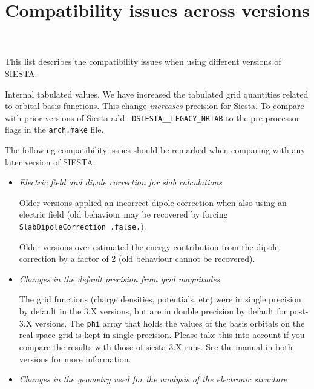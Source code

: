 \documentclass{article}
\title{Compatibility issues across versions}
\author{\siesta}
\newcommand\siesta{\textsc{SIESTA}}
\newcommand{\code}[1]{\texttt{#1}}
\begin{document}
\maketitle

\clearpage

This list describes the compatibility issues when using different versions of \siesta.

\begin{description}
  \setlength\itemsep{1pt}
  \setlength\topsep{1pt}

  \item[\emph{any} --- 4.0.2] %
  Internal tabulated values. We have increased the tabulated grid quantities related to
  orbital basis functions. This change \emph{increases} precision for Siesta. To compare
  with prior versions of Siesta add \texttt{-DSIESTA\_\_LEGACY\_NRTAB} to the pre-processor
  flags in the \texttt{arch.make} file.

  \item[\emph{any} --- 4.0-b2] The following compatibility issues should be remarked when
  comparing with any later version of \siesta.

  \begin{itemize}
    \item \emph{Electric field and dipole correction for slab calculations}

    Older versions applied an incorrect dipole correction when also using an
    electric field (old behaviour may be recovered by forcing \code{SlabDipoleCorrection .false.}). 

    Older versions over-estimated the energy contribution from the dipole correction by a
    factor of 2 (old behaviour cannot be recovered).

  \item\emph{Changes in the default precision from grid magnitudes}

    The grid functions (charge densities, potentials, etc) were in
    single precision by default in the 3.X versions, but are in double
    precision by default for post-3.X versions. The \code{phi}  array that
    holds the values of the basis orbitals on the real-space grid is kept in
    single precision. Please take this into account if you compare the
    results with those of siesta-3.X runs. See the manual in both
    versions for more information.

  \item\emph{Changes in the geometry used for the analysis of the
    electronic structure}


\end{itemize}
\end{description}
\end{document}
